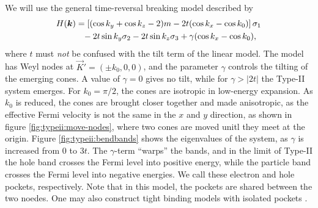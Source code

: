 We will use the general time-reversal breaking model described by \textcite{mccormickMinimalModelsTopological2017}
\begin{equation}
  \begin{split}
    H(\vec{k}) &= \left[ ( \cos k_y + \cos k_z - 2 )m - 2 t (\cos k_x - \cos k_0) \right] \sigma_1\\
    &\pe - 2 t \sin k_y \sigma_2 - 2t \sin k_z \sigma_3
    + \gamma (\cos k_x - \cos k_0),
  \end{split}
\end{equation}
where \( t \) must \emph{not} be confused with the tilt term of the linear model.
The model has Weyl nodes at \(\vec{K}' = (\pm k_{0}, 0,0)\), and the parameter $\gamma$ controls the tilting of the emerging cones.
A value of $\gamma=0$ gives no tilt, while for $\gamma > |2 t|$ the Type-II system emerges.
For \( k_0 = \pi /2 \), the cones are isotropic in low-energy expansion.
As \( k_0 \) is reduced, the cones are brought closer together and made anisotropic, as the effective Fermi velocity is not the same in the \( x \) and \( y \) direction, as shown in figure \ref{fig:typeii:move-nodes}, where two cones are moved unitl they meet at the origin.
Figure \ref{fig:typeii:bendbands} shows the eigenvalues of the system, as \( \gamma \) is increased from 0 to \( 3t \).
The \(\gamma\)-term ``warps'' the bands, and in the limit of Type-II the hole band crosses the Fermi level into positive energy, while the particle band crosses the Fermi level into negative energies.
We call these electron and hole pockets, respectively.
Note that in this model, the pockets are shared between the two noedes.
One may also construct tight binding models with isolated pockets \cite{mccormickMinimalModelsTopological2017}.

